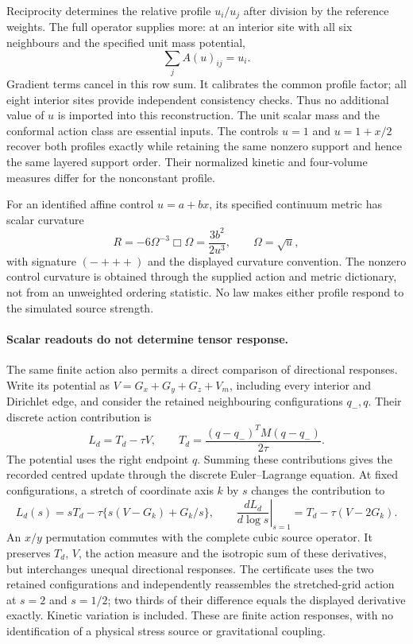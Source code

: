 Reciprocity determines the relative profile $u_i/u_j$ after division by
the reference weights. The full operator supplies more: at an interior
site with all six neighbours and the specified unit mass potential,
\[
 \sum_j A(u)_{ij}=u_i.
\]
Gradient terms cancel in this row sum. It calibrates the common profile
factor; all eight interior sites provide independent consistency checks.
Thus no additional value of $u$ is imported into this reconstruction.
The unit scalar mass and the conformal action class are essential
inputs. The controls $u=1$ and $u=1+x/2$ recover both profiles exactly
while retaining the same nonzero support and hence the same layered
support order. Their normalized kinetic and four-volume measures differ
for the nonconstant profile.

For an identified affine control $u=a+bx$, its specified continuum
metric has scalar curvature
\[
 R=-6\Omega^{-3}\Box\Omega
   =\frac{3b^2}{2u^3},\qquad \Omega=\sqrt u,
\]
with signature $(-+++)$ and the displayed curvature convention.
The nonzero control curvature is obtained through the supplied action
and metric dictionary, not from an unweighted ordering statistic. No
law makes either profile respond to the simulated source strength.

\paragraph{Scalar readouts do not determine tensor response.}
The same finite action also permits a direct comparison of directional
responses. Write its potential as $V=G_x+G_y+G_z+V_m$, including every
interior and Dirichlet edge, and consider the retained neighbouring
configurations $q_-,q$. Their discrete action contribution is
\[
 L_d=T_d-\tau V,\qquad
 T_d=\frac{(q-q_-)^TM(q-q_-)}{2\tau}.
\]
The potential uses the right endpoint $q$. Summing these contributions gives the recorded centred update through
the discrete Euler--Lagrange equation. At fixed configurations, a stretch
of coordinate axis $k$ by $s$ changes the contribution to
\[
 L_d(s)=sT_d-\tau\{s(V-G_k)+G_k/s\},\qquad
 \left.\frac{dL_d}{d\log s}\right|_{s=1}
 =T_d-\tau(V-2G_k).
\]
An $x/y$ permutation commutes with the complete cubic source operator.
It preserves $T_d$, $V$, the action measure and the isotropic sum of
these derivatives, but interchanges unequal directional responses.
The certificate uses the two retained configurations and independently
reassembles the stretched-grid action at $s=2$ and $s=1/2$; two thirds
of their difference equals the displayed derivative exactly. Kinetic
variation is included. These are finite action responses, with no
identification of a physical stress source or gravitational coupling.

